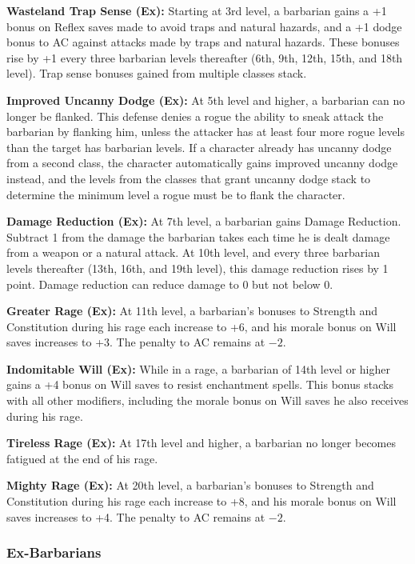 \textbf{Wasteland Trap Sense (Ex):} Starting at 3rd level, a barbarian gains a +1 bonus on Reflex saves made to avoid traps and natural hazards, and a +1 dodge bonus to AC against attacks made by traps and natural hazards. These bonuses rise by +1 every three barbarian levels thereafter (6th, 9th, 12th, 15th, and 18th level). Trap sense bonuses gained from multiple classes stack.

\textbf{Improved Uncanny Dodge (Ex):} At 5th level and higher, a barbarian can no longer be flanked. This defense denies a rogue the ability to sneak attack the barbarian by flanking him, unless the attacker has at least four more rogue levels than the target has barbarian levels. If a character already has uncanny dodge from a second class, the character automatically gains improved uncanny dodge instead, and the levels from the classes that grant uncanny dodge stack to determine the minimum level a rogue must be to flank the character.

\textbf{Damage Reduction (Ex):} At 7th level, a barbarian gains Damage Reduction. Subtract 1 from the damage the barbarian takes each time he is dealt damage from a weapon or a natural attack. At 10th level, and every three barbarian levels thereafter (13th, 16th, and 19th level), this damage reduction rises by 1 point. Damage reduction can reduce damage to 0 but not below 0.

\textbf{Greater Rage (Ex):} At 11th level, a barbarian's bonuses to Strength and Constitution during his rage each increase to +6, and his morale bonus on Will saves increases to +3. The penalty to AC remains at $-2$.

\textbf{Indomitable Will (Ex):} While in a rage, a barbarian of 14th level or higher gains a +4 bonus on Will saves to resist enchantment spells. This bonus stacks with all other modifiers, including the morale bonus on Will saves he also receives during his rage.

\textbf{Tireless Rage (Ex):} At 17th level and higher, a barbarian no longer becomes fatigued at the end of his rage.

\textbf{Mighty Rage (Ex):} At 20th level, a barbarian's bonuses to Strength and Constitution during his rage each increase to +8, and his morale bonus on Will saves increases to +4. The penalty to AC remains at $-2$.

\subsubsection{Ex-Barbarians}


